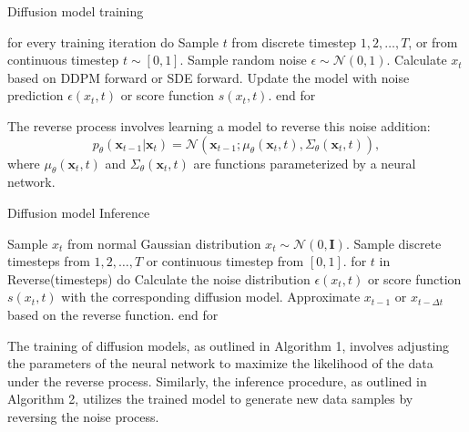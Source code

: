 \documentclass[11pt,a4paper,oneside]{report}
\begin{document}
\begin{algorithm}
\caption{Diffusion model training \cite{bie2023renaissance}}
\begin{algorithmic}[1]
\STATE for every training iteration do
\STATE \hspace{\algorithmicindent} Sample $t$ from discrete timestep $1, 2, \ldots, T$, or from continuous timestep $t \sim [0, 1]$.
\STATE \hspace{\algorithmicindent} Sample random noise $\epsilon \sim \mathcal{N}(0, 1)$.
\STATE \hspace{\algorithmicindent} Calculate $x_t$ based on DDPM forward or SDE forward.
\STATE \hspace{\algorithmicindent} Update the model with noise prediction $\epsilon(x_t, t)$ or score function $s(x_t, t)$.
\STATE end for
\end{algorithmic}
\label{alg:diffusion_model_training}
\end{algorithm}

The reverse process involves learning a model to reverse this noise addition:
\begin{equation}
p_{\theta}(\mathbf{x}_{t-1} | \mathbf{x}_t) = \mathcal{N}(\mathbf{x}_{t-1}; \mu_{\theta}(\mathbf{x}_t, t), \Sigma_{\theta}(\mathbf{x}_t, t)),
\end{equation}
where $\mu_{\theta}(\mathbf{x}_t, t)$ and $\Sigma_{\theta}(\mathbf{x}_t, t)$ are functions parameterized by a neural network.

\begin{algorithm}
\caption{Diffusion model Inference \cite{bie2023renaissance}}
\begin{algorithmic}[1]
\STATE Sample $x_t$ from normal Gaussian distribution $x_t \sim \mathcal{N}(0, \mathbf{I})$.
\STATE Sample discrete timesteps from $1, 2, \ldots, T$ or continuous timestep from $[0,1]$.
\STATE for $t$ in Reverse(timesteps) do
\STATE \hspace{\algorithmicindent} Calculate the noise distribution $\epsilon(x_t, t)$ or score function $s(x_t, t)$ with the corresponding diffusion model.
\STATE \hspace{\algorithmicindent} Approximate $x_{t-1}$ or $x_{t-\Delta t}$ based on the reverse function.
\STATE end for
\end{algorithmic}
\label{alg:diffusion_model_inference}
\end{algorithm}

The training of diffusion models, as outlined in Algorithm 1, involves adjusting the parameters of the neural network to maximize the likelihood of the data under the reverse process. Similarly, the inference procedure, as outlined in Algorithm 2, utilizes the trained model to generate new data samples by reversing the noise process.
\end{document}
